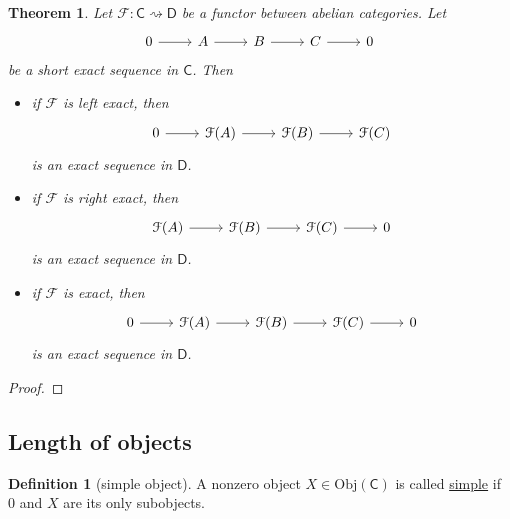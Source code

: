 \documentclass[a4paper]{report}
\newcommand{\defn}[1]{\ul{#1}}
\newcommand{\Obj}{\mathrm{Obj}}
\theoremstyle{definition}
\newtheorem{definition}{Definition}[section]
\theoremstyle{plain}
\newtheorem{theorem}{Theorem}[section]
\theoremstyle{remark}
\begin{document}
\begin{theorem}
  Let $\mathcal{F}\colon \mathsf{C} \rightsquigarrow \mathsf{D}$ be a functor between abelian categories. Let
  \begin{equation*}
    \begin{tikzcd}
      0
      \arrow[r]
      & A
      \arrow[r]
      & B
      \arrow[r]
      & C
      \arrow[r]
      & 0
    \end{tikzcd}
  \end{equation*}
  be a short exact sequence in $\mathsf{C}$. Then 
  \begin{itemize}
    \item if $\mathcal{F}$ is left exact, then
      \begin{equation*}
        \begin{tikzcd}
          0
          \arrow[r]
          & \mathcal{F}(A)
          \arrow[r]
          & \mathcal{F}(B)
          \arrow[r]
          & \mathcal{F}(C)
        \end{tikzcd}
      \end{equation*}
      is an exact sequence in $\mathsf{D}$.

    \item if $\mathcal{F}$ is right exact, then
      \begin{equation*}
        \begin{tikzcd}
          \mathcal{F}(A)
          \arrow[r]
          & \mathcal{F}(B)
          \arrow[r]
          & \mathcal{F}(C)
          \arrow[r]
          & 0
        \end{tikzcd}
      \end{equation*}
      is an exact sequence in $\mathsf{D}$.
    \item if $\mathcal{F}$ is exact, then
      \begin{equation*}
        \begin{tikzcd}
          0
          \arrow[r]
          & \mathcal{F}(A)
          \arrow[r]
          & \mathcal{F}(B)
          \arrow[r]
          & \mathcal{F}(C)
          \arrow[r]
          & 0
        \end{tikzcd}
      \end{equation*}
      is an exact sequence in $\mathsf{D}$.
  \end{itemize}
\end{theorem}
\begin{proof}

\end{proof}

\subsection{Length of objects}
\begin{definition}[simple object]
  \label{def:simpleobject}
  A nonzero object $X \in \Obj(\mathsf{C})$ is called \defn{simple} if $0$ and $X$ are its only subobjects.
\end{definition}
\end{document}
